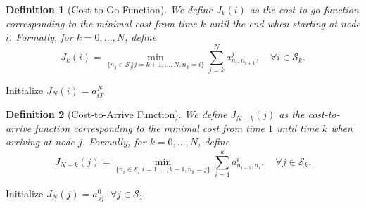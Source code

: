 \documentclass[a4 paper]{article}
\numberwithin{equation}{section}
\theoremstyle{boldStyle}
\theoremstyle{boldBlueStyle}
\theoremstyle{boldPurpleStyle}
\theoremstyle{boldRedStyle}
\newtheorem{definition}{Definition}[section]
\begin{document}
\begin{definition}[Cost-to-Go Function]
  We define \( J_k(i) \) as the cost-to-go function corresponding to the minimal cost from time \( k \) 
  until the end when starting at node \( i \). Formally, for \( k = 0, \ldots, N \), define
  \begin{equation}
      J_k(i) = \min_{\{n_j \in \mathcal{S}_j | j=k+1,\ldots,N,n_k=i\}} \sum_{j=k}^{N} a^j_{n_t, n_{t+1}}, 
      \quad \forall i \in \mathcal{S}_k.
  \end{equation}
\end{definition}


\begin{algorithm}[H]
    \SetNoFillComment
    \SetAlgoLined
    Initialize \( J_N(i) = a^N_{iT} \) \;
    \caption{} \label{algo:dp_solution_shortest_path}
\end{algorithm}


\begin{definition}[Cost-to-Arrive Function]
  We define \( J_{N-k}(j) \) as the cost-to-arrive function corresponding to the minimal cost from time \( 1 \) 
  until time \( k \) when arriving at node \( j \). Formally, for \( k = 0, \ldots, N \), define
  \begin{equation}
      J_{N-k}(j) = \min_{\{n_i \in \mathcal{S}_i | i=1,\ldots,k-1,n_k=j\}} \sum_{i=1}^{k} a^i_{n_{i-1}, n_i}, 
      \quad \forall j \in \mathcal{S}_k.
  \end{equation}
\end{definition}

\begin{algorithm}[H]
    \SetNoFillComment
    \SetAlgoLined
    Initialize \( J_N(j) = a^0_{sj} \), \( \forall j \in \mathcal{S}_1 \) \;
    \caption{} \label{algo:forward_algorithm_shortest_path}
\end{algorithm}
\end{document}
